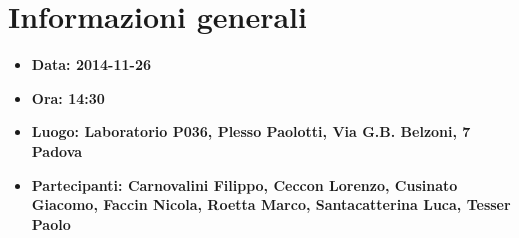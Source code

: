 %

\section{Informazioni generali}
\begin{itemize}
  \item \bfseries{Data:} \textnormal{2014-11-26}
  \item \bfseries{Ora:} \textnormal{14:30}
  \item \bfseries{Luogo:} \textnormal{Laboratorio P036, Plesso Paolotti, Via G.B. Belzoni, 7 Padova}
  \item \bfseries{Partecipanti:} \textnormal{Carnovalini Filippo, Ceccon Lorenzo, Cusinato Giacomo, Faccin Nicola, Roetta Marco, Santacatterina Luca, Tesser Paolo}
\end{itemize}

